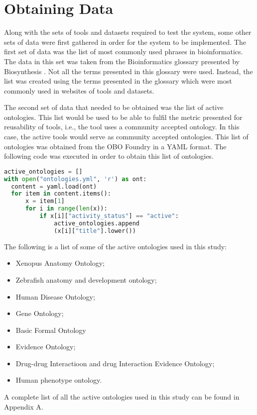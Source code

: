 \documentclass{cisfyp}
\begin{document}
\section{Obtaining Data}
Along with the sets of tools and datasets required to test the system, some other sets of data were first gathered in order for the system to be implemented. The first set of data was the list of most commonly used phrases in bioinformatics. The data in this set was taken from the Bioinformatics glossary presented by Biosynthesis \cite{biogloss}. Not all the terms presented in this glossary were used. Instead, the list was created using the terms presented in the glossary which were most commonly used in websites of tools and datasets.

The second set of data that needed to be obtained was the list of active ontologies. This list would be used to be able to fulfil the metric presented for reusability of tools, i.e., the tool uses a community accepted ontology. In this case, the active tools would serve as community accepted ontologies. This list of ontologies was obtained from the OBO Foundry \cite{obo} in a YAML format. The following code was executed in order to obtain this list of ontologies.
\begin{lstlisting}[frame = single, caption={Obtaining list of ontologies from YAML file.}, captionpos=b, language=Python]
active_ontologies = []
with open("ontologies.yml", 'r') as ont:
  content = yaml.load(ont)
  for item in content.items():
      x = item[1]
      for i in range(len(x)):
          if x[i]["activity_status"] == "active":
              active_ontologies.append
              (x[i]["title"].lower())
\end{lstlisting}
The following is a list of some of the active ontologies used in this study:
\begin{multicols}{2}
\begin{itemize}
	\item Xenopus Anatomy Ontology; \item Zebrafish anatomy and development ontology; \item Human Disease Ontology;
	\item Gene Ontology; \item Basic Formal Ontology \item Evidence Ontology; \item Drug-drug Interactioon and drug Interaction Evidence Ontology;
	\item Human phenotype ontology.
\end{itemize}
\end{multicols}
A complete list of all the active ontologies used in this study can be found in Appendix A.
\end{document}
